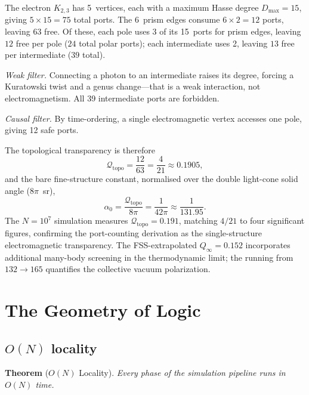 \documentclass[aps,prd,twocolumn,superscriptaddress,nofootinbib,amsmath,amssymb,longbibliography]{revtex4-2}
\newcommand{\Qtopo}{\mathcal{Q}_{\mathrm{topo}}}
\begin{document}
The electron $K_{2,3}$ has 5~vertices, each with a maximum Hasse degree
$D_{\max} = 15$, giving $5 \times 15 = 75$ total ports.
The 6~prism edges consume $6 \times 2 = 12$ ports, leaving 63 free.
Of these, each pole uses 3 of its 15~ports for prism edges, leaving
$12$ free per pole ($24$ total polar ports); each intermediate uses 2,
leaving $13$ free per intermediate ($39$ total).

\emph{Weak filter.}  Connecting a photon to an intermediate raises
its degree, forcing a Kuratowski twist and a genus change---that is a
weak interaction, not electromagnetism.  All 39 intermediate ports are
forbidden.

\emph{Causal filter.}  By time-ordering, a single electromagnetic
vertex accesses one pole, giving 12 safe ports.

The topological transparency is therefore
\begin{equation}
  \Qtopo = \frac{12}{63} = \frac{4}{21} \approx 0.1905,
  \label{eq:qtopo-port}
\end{equation}
and the bare fine-structure constant, normalised over the double
light-cone solid angle ($8\pi$~sr),
\begin{equation}
  \alpha_0 = \frac{\Qtopo}{8\pi} = \frac{1}{42\pi}
  \approx \frac{1}{131.95}.
  \label{eq:alpha-analytical}
\end{equation}
The $N = 10^7$ simulation measures $\Qtopo = 0.191$, matching $4/21$
to four significant figures, confirming the port-counting derivation
as the single-structure electromagnetic transparency.
The FSS-extrapolated $Q_\infty = 0.152$ incorporates additional
many-body screening in the thermodynamic limit; the running from
$132 \to 165$ quantifies the collective vacuum polarization.

\section{The Geometry of Logic}\label{sec:logic}

\subsection{$O(N)$ locality}\label{sec:locality}

\textbf{Theorem} ($O(N)$ Locality).
\emph{Every phase of the simulation pipeline runs in $O(N)$ time.}
\end{document}
